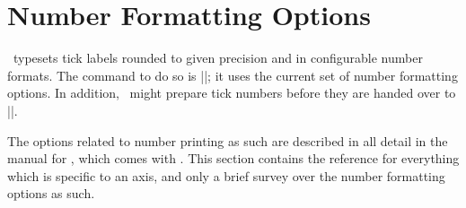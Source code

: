 
\section{Number Formatting Options}
\label{sec:number:printing}%
\PGFPlots\ typesets tick labels rounded to given precision and in configurable number formats. The command to do so is |\pgfmathprintnumber|; it uses the current set of number formatting options. In addition, \PGFPlots\ might prepare tick numbers before they are handed over to |\pgfmathprintnumber|.

The options related to number printing as such are described in all detail in the manual for \PGFPlotstable, which comes with \PGFPlots. This section contains the reference for everything which is specific to an axis, and only a brief survey over the number formatting options as such.

